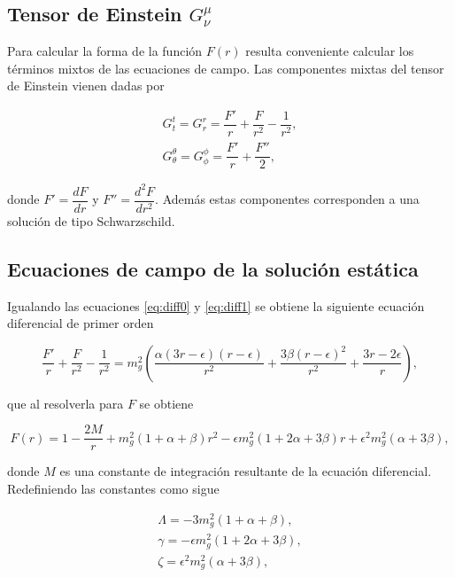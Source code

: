 \subsection{Tensor de Einstein $G^\mu_{\nu}$}

Para calcular la forma de la función $F(r)$ resulta conveniente calcular los términos mixtos de las ecuaciones de campo. Las componentes mixtas del tensor de Einstein vienen dadas por

\begin{gather}
    G^t_t=G^r_r=\dfrac{F'}{r}+\dfrac{F}{r^2}-\dfrac{1}{r^2} ,\label{eq:diff0}\\
    G^\theta_\theta=G^\phi_\phi=\dfrac{F'}{r}+\dfrac{F''}{2},
\end{gather}

donde $F'=\dfrac{dF}{dr}$ y $F''=\dfrac{d^2F}{dr^2}$. Además estas componentes corresponden a una solución de tipo Schwarzschild.

\subsection{Ecuaciones de campo de la solución estática}

Igualando las ecuaciones \eqref{eq:diff0} y \eqref{eq:diff1} se obtiene la siguiente ecuación diferencial de primer orden

\begin{equation}
    \dfrac{F'}{r}+\dfrac{F}{r^2}-\dfrac{1}{r^2}=m_g^2\left(\dfrac{\alpha(3r-\epsilon)(r-\epsilon)}{r^2}+\dfrac{3\beta(r-\epsilon)^2}{r^2}+\dfrac{3r-2\epsilon}{r}\right),
\end{equation}

que al resolverla para $F$ se obtiene 

\begin{equation}
    F(r)=1-\dfrac{2M}{r}+m_g^2(1+\alpha+\beta)r^2-\epsilon m_g^2(1+2\alpha+3\beta)r+\epsilon^2m_g^2(\alpha+3\beta),
\end{equation}

donde $M$ es una constante de integración resultante de la ecuación diferencial. Redefiniendo las constantes como sigue

\begin{gather}
    \Lambda=-3m_g^2(1+\alpha+\beta), \label{eq:Lambda}\\
    \gamma=-\epsilon m_g^2(1+2\alpha+3\beta), \label{eq:gamma}\\
    \zeta=\epsilon^2m_g^2(\alpha+3\beta) \label{eq:zeta},
\end{gather}

